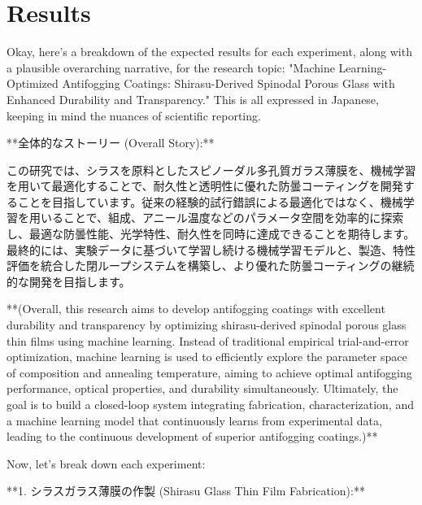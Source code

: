 \documentclass{article}
\begin{document}
\section{Results}
Okay, here's a breakdown of the expected results for each experiment, along with a plausible overarching narrative, for the research topic: "Machine Learning-Optimized Antifogging Coatings: Shirasu-Derived Spinodal Porous Glass with Enhanced Durability and Transparency."  This is all expressed in Japanese, keeping in mind the nuances of scientific reporting.

**全体的なストーリー (Overall Story):**

この研究では、シラスを原料としたスピノーダル多孔質ガラス薄膜を、機械学習を用いて最適化することで、耐久性と透明性に優れた防曇コーティングを開発することを目指しています。従来の経験的試行錯誤による最適化ではなく、機械学習を用いることで、組成、アニール温度などのパラメータ空間を効率的に探索し、最適な防曇性能、光学特性、耐久性を同時に達成できることを期待します。最終的には、実験データに基づいて学習し続ける機械学習モデルと、製造、特性評価を統合した閉ループシステムを構築し、より優れた防曇コーティングの継続的な開発を目指します。

**(Overall, this research aims to develop antifogging coatings with excellent durability and transparency by optimizing shirasu-derived spinodal porous glass thin films using machine learning.  Instead of traditional empirical trial-and-error optimization, machine learning is used to efficiently explore the parameter space of composition and annealing temperature, aiming to achieve optimal antifogging performance, optical properties, and durability simultaneously.  Ultimately, the goal is to build a closed-loop system integrating fabrication, characterization, and a machine learning model that continuously learns from experimental data, leading to the continuous development of superior antifogging coatings.)**

Now, let's break down each experiment:

**1. シラスガラス薄膜の作製 (Shirasu Glass Thin Film Fabrication):**
\end{document}
